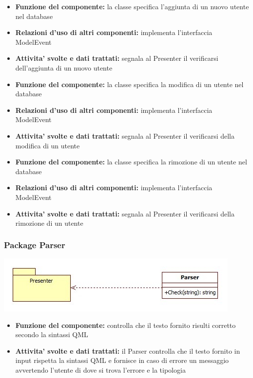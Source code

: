 \documentclass[a4paper,11pt]{article}
\begin{document}
			\begin{itemize}
		    	\item\textbf{Funzione del componente:} la classe specifica l'aggiunta di un nuovo utente nel database
				\item\textbf{Relazioni d'uso di altri componenti:} implementa l'interfaccia ModelEvent
				\item\textbf{Attivita' svolte e dati trattati:} segnala al Presenter il verificarsi dell'aggiunta di un nuovo utente
			\end{itemize}
			\begin{itemize}
		    	\item\textbf{Funzione del componente:} la classe specifica la modifica di un utente nel database
				\item\textbf{Relazioni d'uso di altri componenti:} implementa l'interfaccia ModelEvent
				\item\textbf{Attivita' svolte e dati trattati:} segnala al Presenter il verificarsi della modifica di un utente
			\end{itemize}
			\begin{itemize}
		    	\item\textbf{Funzione del componente:} la classe specifica la rimozione di un utente nel database
				\item\textbf{Relazioni d'uso di altri componenti:} implementa l'interfaccia ModelEvent
				\item\textbf{Attivita' svolte e dati trattati:} segnala al Presenter il verificarsi della rimozione di un utente
			\end{itemize}
			
			\subsubsection{Package Parser}
			\begin{center}
				\includegraphics[scale=0.6]{../images/Parser.jpg}
			\end{center}
 			\begin{itemize}
		    	\item\textbf{Funzione del componente:} controlla che il testo fornito risulti corretto secondo la sintassi QML
			\item\textbf{Attivita' svolte e dati trattati:} il Parser controlla che il testo fornito in input rispetta la sintassi QML e fornisce in caso di errore un messaggio avvertendo l'utente di dove si trova l'errore e la tipologia
			\end{itemize}
			
\end{document}
